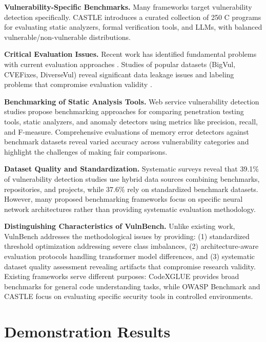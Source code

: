 \documentclass[letterpaper]{article}
\begin{document}
\textbf{Vulnerability-Specific Benchmarks.} Many frameworks target vulnerability detection specifically. CASTLE \citep{castle2025} introduces a curated collection of 250 C programs for evaluating static analyzers, formal verification tools, and LLMs, with balanced vulnerable/non-vulnerable distributions.

\textbf{Critical Evaluation Issues.} Recent work has identified fundamental problems with current evaluation approaches \citep{risse2025top}. Studies of popular datasets (BigVul, CVEFixes, DiverseVul) reveal significant data leakage issues and labeling problems that compromise evaluation validity \citep{ullah2024vulnerability}.

\textbf{Benchmarking of Static Analysis Tools.} Web service vulnerability detection studies \citep{antunes2010benchmarking} propose benchmarking approaches for comparing penetration testing tools, static analyzers, and anomaly detectors using metrics like precision, recall, and F-measure. Comprehensive evaluations of memory error detectors \citep{zhang2021evaluating} against benchmark datasets reveal varied accuracy across vulnerability categories and highlight the challenges of making fair comparisons.

\textbf{Dataset Quality and Standardization.} Systematic surveys \citep{systematic2024survey} reveal that 39.1\% of vulnerability detection studies use hybrid data sources combining benchmarks, repositories, and projects, while 37.6\% rely on standardized benchmark datasets. However, many proposed benchmarking frameworks \citep{lin2020deep} focus on specific neural network architectures rather than providing systematic evaluation methodology.

\textbf{Distinguishing Characteristics of VulnBench.} Unlike existing work, VulnBench addresses the methodological issues by providing: (1) standardized threshold optimization addressing severe class imbalances, (2) architecture-aware evaluation protocols handling transformer model differences, and (3) systematic dataset quality assessment revealing artifacts that compromise research validity. Existing frameworks serve different purposes: CodeXGLUE provides broad benchmarks for general code understanding tasks, while OWASP Benchmark and CASTLE focus on evaluating specific security tools in controlled environments.

\section{Demonstration Results}
\end{document}
